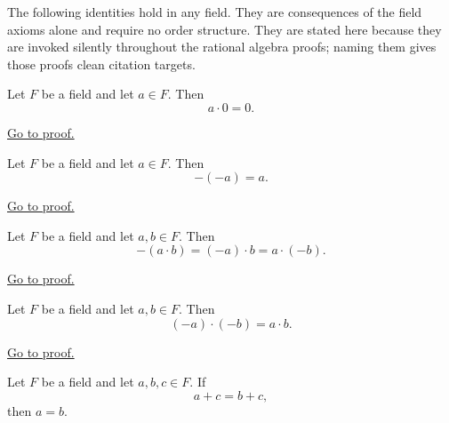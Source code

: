\begin{remark}
\label{rem:field-identity-consequences}
The following identities hold in any field.  They are consequences of
the field axioms alone and require no order structure.  They are stated
here because they are invoked silently throughout the rational algebra
proofs; naming them gives those proofs clean citation targets.
\end{remark}

\begin{theorem}
\label{thm:zero-product}
Let $F$ be a field and let $a\in F$.  Then
\[
a\cdot 0 = 0.
\]
\end{theorem}

\begin{remark*}[Proof]
\hyperref[prf:zero-product]{Go to proof.}
\end{remark*}

\begin{theorem}
\label{thm:double-negation}
Let $F$ be a field and let $a\in F$.  Then
\[
-(-a) = a.
\]
\end{theorem}

\begin{remark*}[Proof]
\hyperref[prf:double-negation]{Go to proof.}
\end{remark*}

\begin{theorem}
\label{thm:negation-of-product}
Let $F$ be a field and let $a,b\in F$.  Then
\[
-(a\cdot b) = (-a)\cdot b = a\cdot(-b).
\]
\end{theorem}

\begin{remark*}[Proof]
\hyperref[prf:negation-of-product]{Go to proof.}
\end{remark*}

\begin{corollary}
\label{cor:product-of-negatives}
Let $F$ be a field and let $a,b\in F$.  Then
\[
(-a)\cdot(-b) = a\cdot b.
\]
\end{corollary}

\begin{remark*}[Proof]
\hyperref[prf:product-of-negatives]{Go to proof.}
\end{remark*}

\begin{theorem}
\label{thm:additive-cancellation}
Let $F$ be a field and let $a,b,c\in F$.  If
\[
a + c = b + c,
\]
then $a = b$.
\end{theorem}


